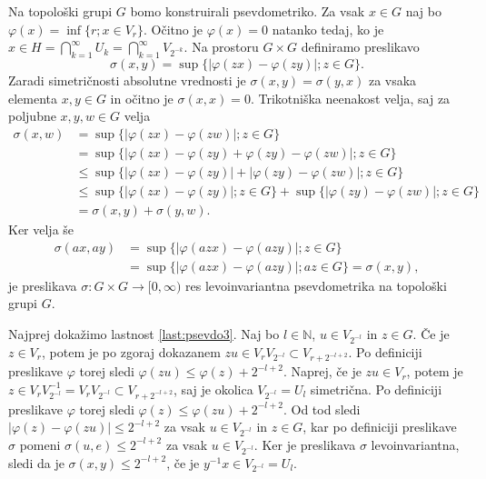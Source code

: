 \documentclass[mat1]{fmfdelo}
\newcommand{\N}{\mathbb N}
\begin{document}
\begin{dokaz}
Na topološki grupi $G$ bomo konstruirali psevdometriko. Za vsak $x \in G$ naj bo $\varphi(x) = \inf\lbrace r ; x \in V_r \rbrace$. Očitno je $\varphi(x) = 0$ natanko tedaj, ko je $x \in H = \bigcap_{k=1}^{\infty} U_k = \bigcap_{k=1}^{\infty} V_{2^{-k}}$. Na prostoru $G \times G$ definiramo preslikavo
\[ \sigma(x, y) = \sup\lbrace |\varphi(zx) - \varphi(zy)| ; z \in G \rbrace. \]
Zaradi simetričnosti absolutne vrednosti je $\sigma(x, y) = \sigma(y, x)$ za vsaka elementa $x, y \in G$ in očitno je $\sigma(x, x) = 0$. Trikotniška neenakost velja, saj za poljubne $x, y, w \in G$ velja
\begin{align*}
\sigma(x, w) &= \sup\lbrace |\varphi(zx) - \varphi(zw)| ; z \in G \rbrace \\
&= \sup\lbrace |\varphi(zx) - \varphi(zy) + \varphi(zy) - \varphi(zw)| ; z \in G \rbrace \\
&\leq \sup\lbrace |\varphi(zx) - \varphi(zy)| + |\varphi(zy) - \varphi(zw)| ; z \in G \rbrace \\
&\leq \sup\lbrace |\varphi(zx) - \varphi(zy)| ; z \in G \rbrace + \sup\lbrace |\varphi(zy) - \varphi(zw)| ; z \in G \rbrace \\
&= \sigma(x, y) + \sigma(y, w).
\end{align*}
Ker velja še
\begin{align*}
\sigma(ax, ay) &= \sup\lbrace |\varphi(azx) - \varphi(azy)| ; z \in G \rbrace \\
&= \sup\lbrace |\varphi(azx) - \varphi(azy)| ; az \in G \rbrace = \sigma(x, y),
\end{align*}
je preslikava $\sigma\colon G \times G \to [0, \infty)$ res levoinvariantna psevdometrika na topološki grupi $G$.

Najprej dokažimo lastnost \ref{last:psevdo3}. Naj bo $l \in \N$, $u \in V_{2^{-l}}$ in $z \in G$. Če je $z \in V_r$, potem je po zgoraj dokazanem $zu \in V_rV_{2^{-l}} \subset V_{r + 2^{-l+2}}$. Po definiciji preslikave $\varphi$ torej sledi $\varphi(zu) \leq \varphi(z) + 2^{-l+2}$. Naprej, če je $zu \in V_r$, potem je $z \in V_rV_{2^{-l}}^{-1} = V_rV_{2^{-l}} \subset V_{r + 2^{-l+2}}$, saj je okolica $V_{2^{-l}} = U_l$ simetrična. Po definiciji preslikave $\varphi$ torej sledi $\varphi(z) \leq \varphi(zu) + 2^{-l+2}$. Od tod sledi $|\varphi(z) - \varphi(zu)| \leq 2^{-l+2}$ za vsak $u \in V_{2^{-l}}$ in $z \in G$, kar po definiciji preslikave $\sigma$ pomeni $\sigma(u, e) \leq 2^{-l+2}$ za vsak $u \in V_{2^{-l}}$. Ker je preslikava $\sigma$ levoinvariantna, sledi da je $\sigma(x, y) \leq 2^{-l+2}$, če je $y^{-1}x \in V_{2^{-l}} = U_l$.


\end{dokaz}
\end{document}
